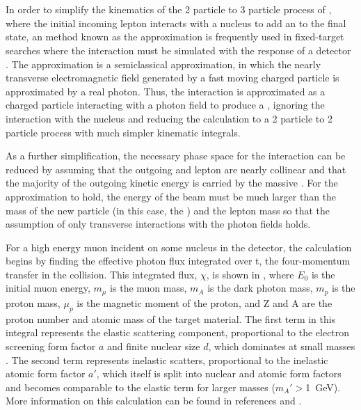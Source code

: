 \section{\ww}
\label{sec:wwApprox}
In order to simplify the kinematics of the 2 particle to 3 particle process of \dbrem, where the initial incoming lepton interacts with a nucleus to add an \aprime to the final state, an method known as the \ww approximation \cite{vonWeizsacker:1934nji,Williams:1935dka} is frequently used in fixed-target searches where the interaction must be simulated with the response of a detector \cite{Bjorken_2009,Andreas_2012}.
The \ww approximation is a semiclassical approximation, in which the nearly transverse electromagnetic field generated by a fast moving charged particle is approximated by a real photon. 
Thus, the interaction is approximated as a charged particle interacting with a photon field to produce a \aprime, ignoring the interaction with the nucleus and reducing the calculation to a 2 particle to 2 particle process with much simpler kinematic integrals.

As a further simplification, the necessary phase space for the interaction can be reduced by assuming that the outgoing \aprime and lepton are nearly collinear and that the majority of the outgoing kinetic energy is carried by the massive \aprime.
For the approximation to hold, the energy of the beam must be much larger than the mass of the new particle (in this case, the \aprime) and the lepton mass so that the assumption of only transverse interactions with the photon fields holds. 

For a high energy muon incident on some nucleus in the detector, the calculation begins by finding the effective photon flux integrated over t, the four-momentum transfer in the collision. 
This integrated flux, $\chi$, is shown in , where $E_0$ is the initial muon energy, $m_\mu$ is the muon mass, $m_A$ is the dark photon mass, $m_p$ is the proton mass, $\mu_p$ is the magnetic moment of the proton, and Z and A are the proton number and atomic mass of the target material.
The first term in this integral represents the  elastic scattering component, proportional to the electron screening form factor $a$ and finite nuclear size $d$, which dominates at small \aprime masses .
The second term represents inelastic scatters, proportional to the inelastic atomic form factor $a'$, which itself is split into nuclear and atomic form factors and becomes comparable to the elastic term for larger \aprime masses ($m_A'>$\SI{1}{\giga\eV}).
More information on this calculation can be found in references \cite{kim_1973} and \cite{tsai_1974}. 

